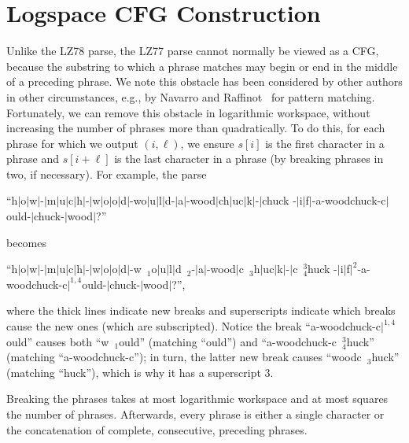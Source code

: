 \documentclass[runningheads]{llncs}
\begin{document}
\section{Logspace CFG Construction} \label{sec:grammar}

Unlike the LZ78 parse, the LZ77 parse cannot normally be viewed as a CFG, because the substring to which a phrase matches may begin or end in the middle of a preceding phrase.  We note this obstacle has been considered by other authors in other circumstances, e.g., by Navarro and Raffinot~\cite{NR04} for pattern matching.  Fortunately, we can remove this obstacle in logarithmic workspace, without increasing the number of phrases more than quadratically.  To do this, for each phrase for which we output \((i, \ell)\), we ensure \(s [i]\) is the first character in a phrase and \(s [i + \ell]\) is the last character in a phrase (by breaking phrases in two, if necessary).  For example, the parse
\begin{center}
``{\sf h$|$o$|$w$|$-$|$m$|$u$|$c$|$h$|$-$|$w$|$o$|$o$|$d$|$-wo$|$u$|$l$|$d-$|$a$|$-wood$|$ch$|$uc$|$k$|$-$|$chuck
\linebreak
-$|$i$|$f$|$-a-woodchuck-c$|$ould-$|$chuck-$|$wood$|$?}''
\end{center}
becomes
\begin{center}
``{\sf h$|$o$|$w$|$-$|$m$|$u$|$c$|$h$|$-$|$w$|$o$|$o$|$d$|$-w\ \raisebox{-.6ex}{\rule{.3ex}{2.5ex}}$_1$o$|$u$|$l$|$d\ \raisebox{-.6ex}{\rule{.3ex}{2.5ex}}$_2$-$|$a$|$-wood$|$c\ \raisebox{-.6ex}{\rule{.3ex}{2.5ex}}$_3$h$|$uc$|$k$|$-$|$c\ \raisebox{-.6ex}{\rule{.3ex}{2.5ex}}$_4^3$huck
\linebreak
-$|$i$|$f$|^2$-a-woodchuck-c$|^{1, 4}$ould-$|$chuck-$|$wood$|$?}'',
\end{center}
where the thick lines indicate new breaks and superscripts indicate which breaks cause the new ones (which are subscripted).  Notice the break ``{\sf a-woodchuck-c$|^{1, 4}$ould}'' causes both ``{\sf w\ \raisebox{-.6ex}{\rule{.3ex}{2.5ex}}$_1$ould}'' (matching ``{\sf ould}'') and ``{\sf a-woodchuck-c\ \raisebox{-.6ex}{\rule{.3ex}{2.5ex}}$_4^3$huck}'' (matching ``{\sf a-woodchuck-c}''); in turn, the latter new break causes ``{\sf woodc\ \raisebox{-.6ex}{\rule{.3ex}{2.5ex}}$_3$huck}'' (matching ``{\sf huck}''), which is why it has a superscript 3.

\begin{lemma} \label{lem:breaks}
Breaking the phrases takes at most logarithmic workspace and at most squares the number of phrases.  Afterwards, every phrase is either a single character or the concatenation of complete, consecutive, preceding phrases.
\end{lemma}
\end{document}
